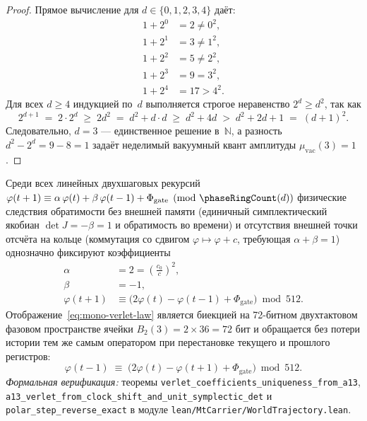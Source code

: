 \begin{proof}
Прямое вычисление для $d \in \{0, 1, 2, 3, 4\}$ даёт:
\begin{align*}
  1 + 2^0 &= 2 \ne 0^2, \\
  1 + 2^1 &= 3 \ne 1^2, \\
  1 + 2^2 &= 5 \ne 2^2, \\
  1 + 2^3 &= 9 = 3^2, \\
  1 + 2^4 &= 17 > 4^2.
\end{align*}
Для всех $d \ge 4$ индукцией по~$d$ выполняется строгое неравенство $2^d \ge d^2$, так как
\[
  2^{d+1} \;=\; 2\cdot 2^d \;\ge\; 2d^2 \;=\; d^2 + d\cdot d \;\ge\; d^2 + 4d \;>\; d^2 + 2d + 1 \;=\; (d+1)^2.
\]
Следовательно, $d=3$ --- единственное решение в~$\mathbb{N}$, а разность $d^2 - 2^d = 9 - 8 = 1$ задаёт неделимый вакуумный квант амплитуды $\mu_{\mathrm{vac}}(3) = 1$.
\end{proof}

\begin{theorem}
\label{thm:mono-verlet-uniqueness}
Среди всех линейных двухшаговых рекурсий $\varphi(t+1) \equiv \alpha\,\varphi(t) + \beta\,\varphi(t-1) + \Phi_{\mathrm{gate}} \pmod{\phaseRingCount(d)}$ физические следствия обратимости без внешней памяти (единичный симплектический якобиан $\det J = -\beta = 1$ и обратимость во времени) и отсутствия внешней точки отсчёта на кольце (коммутация со сдвигом $\varphi \mapsto \varphi + c$, требующая $\alpha + \beta = 1$) однозначно фиксируют коэффициенты
\begin{align}
  \alpha &= 2 = \left(\frac{c_0}{c}\right)^2, \label{eq:mono-verlet-alpha} \\
  \beta &= -1, \label{eq:mono-verlet-beta} \\
  \varphi(t+1) &\equiv \bigl(2\varphi(t) - \varphi(t-1) + \Phi_{\mathrm{gate}}\bigr) \bmod 512. \label{eq:mono-verlet-law}
\end{align}
Отображение~\eqref{eq:mono-verlet-law} является биекцией на 72-битном двухтактовом фазовом пространстве ячейки $B_2(3) = 2 \times 36 = 72\text{ бит}$ и обращается без потери истории тем же самым оператором при перестановке текущего и прошлого регистров:
\begin{equation}
  \label{eq:mono-verlet-reverse}
  \varphi(t-1) \;\equiv\; \bigl(2\varphi(t) - \varphi(t+1) + \Phi_{\mathrm{gate}}\bigr) \bmod 512.
\end{equation}
\emph{Формальная верификация:} теоремы \texttt{verlet\_\allowbreak coefficients\_\allowbreak uniqueness\_\allowbreak from\_\allowbreak a13}, \texttt{a13\_\allowbreak verlet\_\allowbreak from\_\allowbreak clock\_\allowbreak shift\_\allowbreak and\_\allowbreak unit\_\allowbreak symplectic\_\allowbreak det} и \texttt{polar\_\allowbreak step\_\allowbreak reverse\_\allowbreak exact} в модуле \texttt{lean/\allowbreak MtCarrier/\allowbreak WorldTrajectory.lean}.
\end{theorem}

